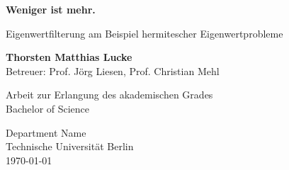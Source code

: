 \begin{titlepage}
  \begin{center}
    \vspace*{1cm}

    \Huge
    \textbf{\glqq Weniger ist mehr.\grqq}

    \vspace{0.5cm}
    \LARGE
    Eigenwertfilterung am Beispiel hermitescher Eigenwertprobleme

    \vspace{1.5cm}

    \textbf{Thorsten Matthias Lucke}\\
    Betreuer: Prof. Jörg Liesen, Prof. Christian Mehl

    \vfill

    Arbeit zur Erlangung des akademischen Grades\\
    Bachelor of Science

    \vspace{0.8cm}


    \Large
    Department Name\\
    Technische Universität Berlin\\
    \today

  \end{center}
\end{titlepage}
